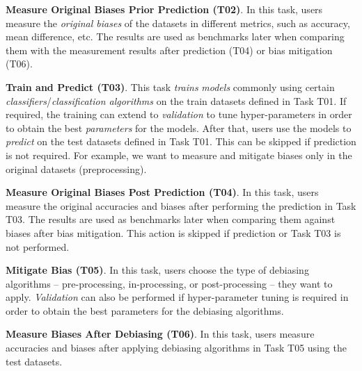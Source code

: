 \documentclass[sigconf,review]{acmart}
\begin{document}
\textbf{Measure Original Biases Prior Prediction (T02)}. In this task, users measure the \textit{original biases} of the datasets in different metrics, such as accuracy, mean difference, etc. The results are used as benchmarks later when comparing them with the measurement results after prediction (T04) or bias mitigation (T06).  

\textbf{Train and Predict (T03)}. This task \textit{trains} \textit{models} commonly using certain \textit{classifiers}/\textit{classification algorithms} on the train datasets defined in Task T01. If required, the training can extend to \textit{validation} to tune hyper-parameters in order to obtain the best \textit{parameters} for the models. After that, users use the models to \textit{predict} on the test datasets defined in Task T01. This  can be skipped if prediction is not required. For example, we want to measure and mitigate biases only in the original datasets (preprocessing).

\textbf{Measure Original Biases Post Prediction (T04)}. In this task, users measure the original accuracies and biases after performing the prediction in Task T03. The results are used as benchmarks later when comparing them against biases after bias mitigation. This action is skipped if prediction or Task T03 is not performed.

\textbf{Mitigate Bias (T05)}. In this task, users choose the type of debiasing algorithms -- pre-processing, in-processing, or post-processing -- they want to apply. \textit{Validation} can also be performed if hyper-parameter tuning is required in order to obtain the best parameters for the debiasing algorithms.

\textbf{Measure Biases After Debiasing (T06)}. In this task, users measure accuracies and biases after applying debiasing algorithms in Task T05 using the test datasets. 
\end{document}
